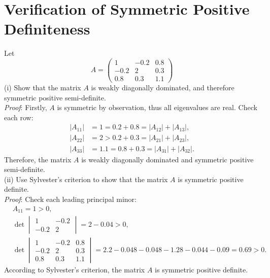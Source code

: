 \documentclass[paper=a4, fontsize=11pt]{scrartcl} %
\numberwithin{equation}{section} %
\numberwithin{figure}{section} %
\numberwithin{table}{section} %
\begin{document}
\newpage



\section{Verification of Symmetric Positive Definiteness}
Let 
$$
A =\begin{pmatrix}
1 & -0.2 & 0.8 \\
-0.2 & 2 & 0.3 \\
0.8 & 0.3 & 1.1
\end{pmatrix}
$$
(i) Show that the matrix $A$ is weakly diagonally dominated, and therefore symmetric positive semi-definite.\\
\textit{Proof}: Firstly, $A$ is symmetric by observation, thus all eigenvalues are real. Check each row:
\begin{align}
\nonumber |A_{11}| &= 1 = 0.2 + 0.8 = |A_{12}| + |A_{13}|,\\
\nonumber |A_{22}| &= 2 > 0.2 + 0.3 = |A_{21}| + |A_{23}|,\\
\nonumber |A_{33}| &= 1.1 = 0.8 + 0.3 = |A_{31}| + |A_{32}|.
\end{align}
Therefore, the matrix $A$ is weakly diagonally dominated and symmetric positive semi-definite.\\

(ii) Use Sylvester's criterion to show that the matrix $A$ is symmetric positive definite.\\
\textit{Proof}: Check each leading principal minor:
\begin{align}
\nonumber  &A_{11}= 1 > 0,\\
\nonumber  &\det\begin{vmatrix}
1 & -0.2 \\
-0.2 & 2 
\end{vmatrix} = 2 - 0.04 > 0, \\
\nonumber  &\det\begin{vmatrix}
1 & -0.2 & 0.8 \\
-0.2 & 2 & 0.3 \\
0.8 & 0.3 & 1.1
\end{vmatrix} = 2.2 - 0.048 -0.048 - 1.28 - 0.044 - 0.09 = 0.69 > 0.
\end{align}
According to Sylvester's criterion, the matrix $A$ is symmetric positive definite.

\newpage
\end{document}
